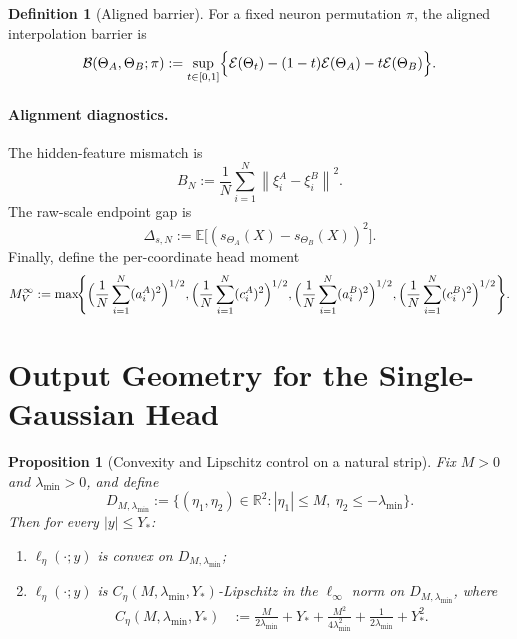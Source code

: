 \documentclass[11pt]{article}
\newtheorem{proposition}[theorem]{Proposition}
\theoremstyle{definition}
\newtheorem{definition}[theorem]{Definition}
\newcommand{\R}{\mathbb{R}}
\newcommand{\E}{\mathbb{E}}
\newcommand{\norm}[1]{\left\lVert #1 \right\rVert}
\newcommand{\cE}{\mathcal{E}}
\newcommand{\cB}{\mathcal{B}}
\begin{document}
\begin{definition}[Aligned barrier]
For a fixed neuron permutation $\pi$, the aligned interpolation barrier is
\[
  \cB(\Theta_A,\Theta_B;\pi)
  :=
  \sup_{t\in[0,1]}
  \Bigl\{
    \cE(\Theta_t)
    -
    (1-t)\cE(\Theta_A)
    -
    t\cE(\Theta_B)
  \Bigr\}.
\]
\end{definition}

\paragraph{Alignment diagnostics.}
The hidden-feature mismatch is
\begin{equation}
  B_N
  :=
  \frac1N\sum_{i=1}^N \norm{\xi_i^A-\xi_i^B}^2.
  \label{eq:hidden_mismatch}
\end{equation}
The raw-scale endpoint gap is
\begin{equation}
  \Delta_{s,N}
  :=
  \E\bigl[(s_{\Theta_A}(X)-s_{\Theta_B}(X))^2\bigr].
  \label{eq:scale_gap}
\end{equation}
Finally, define the per-coordinate head moment
\begin{equation}
  M_V^\infty
  :=
  \max\!\Biggl\{
    \Bigl(\frac1N\sum_{i=1}^N (a_i^A)^2\Bigr)^{1/2},
    \Bigl(\frac1N\sum_{i=1}^N (c_i^A)^2\Bigr)^{1/2},
    \Bigl(\frac1N\sum_{i=1}^N (a_i^B)^2\Bigr)^{1/2},
    \Bigl(\frac1N\sum_{i=1}^N (c_i^B)^2\Bigr)^{1/2}
  \Biggr\}.
  \label{eq:head_moment}
\end{equation}

\section{Output Geometry for the Single-Gaussian Head}

\begin{proposition}[Convexity and Lipschitz control on a natural strip]
\label{prop:convex-lipschitz-strip}
Fix $M>0$ and $\lambda_{\min}>0$, and define
\[
  D_{M,\lambda_{\min}}
  :=
  \{(\eta_1,\eta_2)\in\R^2: |\eta_1|\le M,\ \eta_2\le -\lambda_{\min}\}.
\]
Then for every $|y|\le Y_\ast$:
\begin{enumerate}[label=(\roman*)]
  \item $\ell_\eta(\cdot;y)$ is convex on $D_{M,\lambda_{\min}}$;
  \item $\ell_\eta(\cdot;y)$ is $C_\eta(M,\lambda_{\min},Y_\ast)$-Lipschitz in
  the $\ell_\infty$ norm on $D_{M,\lambda_{\min}}$, where
  \begin{align}
    C_\eta(M,\lambda_{\min},Y_\ast)
    &:=
    \frac{M}{2\lambda_{\min}} + Y_\ast
    + \frac{M^2}{4\lambda_{\min}^2}
    + \frac{1}{2\lambda_{\min}}
    + Y_\ast^2.
    \label{eq:Ceta}
  \end{align}
\end{enumerate}
\end{proposition}
\end{document}
